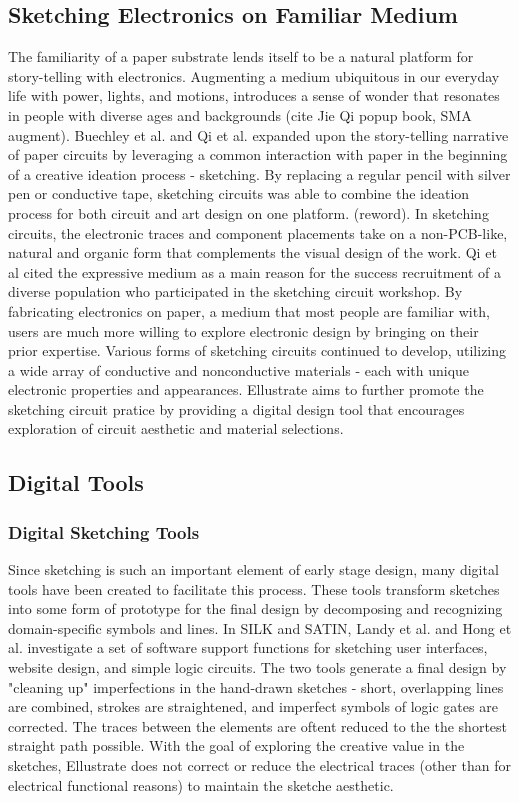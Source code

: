 \documentclass{sigchi}
\begin{document}
\subsection{Sketching Electronics on Familiar Medium}
The familiarity of a paper substrate lends itself to be a natural platform for story-telling with electronics. Augmenting a medium ubiquitous in our everyday life with power, lights, and motions, introduces a sense of wonder that resonates in people with diverse ages and backgrounds \cite{karagozler_paper_2013}(cite Jie Qi popup book, SMA augment). Buechley et al. and Qi et al. expanded upon the story-telling narrative of paper circuits by leveraging a common interaction with paper in the beginning of a creative ideation process - sketching. By replacing a regular pencil with silver pen or conductive tape, sketching circuits was able to combine the ideation process for both circuit and art design on one platform. (reword). In sketching circuits, the electronic traces and component placements take on a non-PCB-like, natural and organic form that complements the visual design of the work. Qi et al cited the expressive medium as a main reason for the success recruitment of a diverse population who participated in the sketching circuit workshop. By fabricating electronics on paper, a medium that most people are familiar with, users are much more willing to explore electronic design by bringing on their prior expertise. Various forms of sketching circuits continued to develop, utilizing a wide array of conductive and nonconductive materials - each with unique electronic properties and appearances.  Ellustrate aims to further promote the sketching circuit pratice by providing a digital design tool that encourages exploration of circuit aesthetic and material selections.
\subsection{Digital Tools}

\subsubsection{Digital Sketching Tools}
Since sketching is such an important element of early stage design, many digital tools have been created to facilitate this process. These tools transform sketches into some form of prototype for the final design by decomposing and recognizing domain-specific symbols and lines. In SILK and SATIN, Landy et al. and Hong et al. investigate a set of software support functions for sketching user interfaces, website design, and simple logic circuits. The two tools generate a final design by "cleaning up" imperfections in the hand-drawn sketches - short, overlapping lines are combined, strokes are straightened, and imperfect symbols of logic gates are corrected. The traces between the elements are oftent reduced to the the shortest straight path possible. With the goal of exploring the creative value in the sketches, Ellustrate does not correct or reduce the electrical traces (other than for electrical functional reasons) to maintain the sketche aesthetic.
\end{document}
